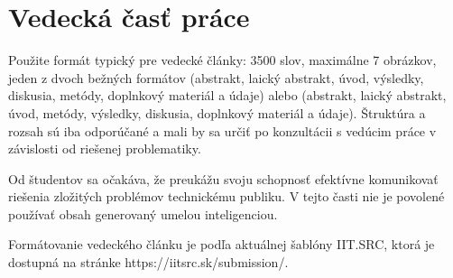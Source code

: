 \section{Vedecká časť práce}
Použite formát typický pre vedecké články:  3500 slov, maximálne 7 obrázkov, jeden z dvoch bežných formátov (abstrakt, laický abstrakt, úvod, výsledky, diskusia, metódy, doplnkový materiál a údaje) alebo (abstrakt, laický abstrakt, úvod, metódy, výsledky, diskusia, doplnkový materiál a údaje). Štruktúra a rozsah sú iba odporúčané a mali by sa určiť po konzultácii s vedúcim práce v závislosti od riešenej problematiky.

Od študentov sa očakáva, že preukážu svoju schopnosť efektívne komunikovať riešenia zložitých problémov technickému publiku. V tejto časti nie je povolené používať obsah generovaný umelou inteligenciou.

Formátovanie vedeckého článku je podľa aktuálnej šablóny IIT.SRC, ktorá je dostupná na stránke https://iitsrc.sk/submission/.



